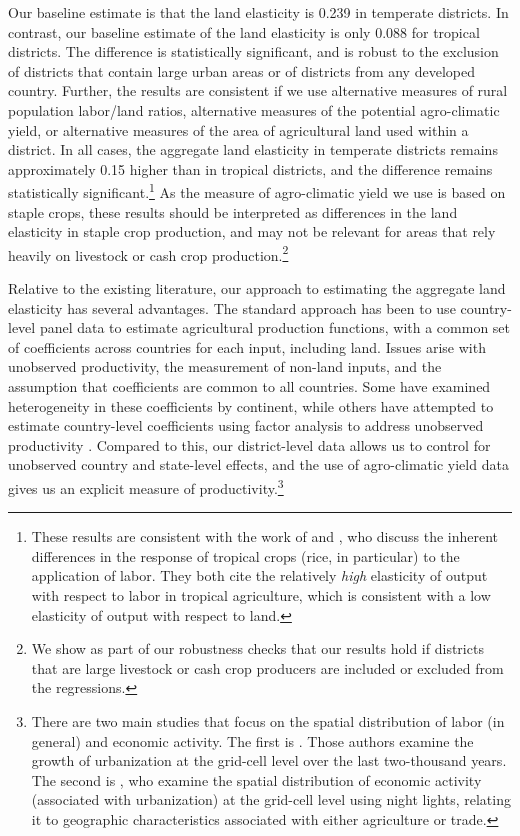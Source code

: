 \documentclass[11pt]{article}
\begin{document}
Our baseline estimate is that the land elasticity is 0.239 in temperate districts. In contrast, our baseline estimate of the land elasticity is only 0.088 for tropical districts. The difference is statistically significant, and is robust to the exclusion of districts that contain large urban areas or of districts from any developed country. Further, the results are consistent if we use alternative measures of rural population labor/land ratios, alternative measures of the potential agro-climatic yield, or alternative measures of the area of agricultural land used within a district. In all cases, the aggregate land elasticity in temperate districts remains approximately 0.15 higher than in tropical districts, and the difference remains statistically significant.\footnote{These results are consistent with the work of \citet{Ruthenberg:1976zr} and \citet{bray1994}, who discuss the inherent differences in the response of tropical crops (rice, in particular) to the application of labor. They both cite the relatively \textit{high} elasticity of output with respect to labor in tropical agriculture, which is consistent with a low elasticity of output with respect to land.} As the measure of agro-climatic yield we use is based on staple crops, these results should be interpreted as differences in the land elasticity in staple crop production, and may not be relevant for areas that rely heavily on livestock or cash crop production.\footnote{We show as part of our robustness checks that our results hold if districts that are large livestock or cash crop producers are included or excluded from the regressions.}

Relative to the existing literature, our approach to estimating the aggregate land elasticity has several advantages. The standard approach has been to use country-level panel data \citep{Hayami:1970ly,Hayami:1985cr,cpr1997,mm2001,Mundlak:2000dq,mbl2012,et2013mango} to estimate agricultural production functions, with a common set of coefficients across countries for each input, including land. Issues arise with unobserved productivity, the measurement of non-land inputs, and the assumption that coefficients are common to all countries. Some have examined heterogeneity in these coefficients \citep{gg2003,Wiebe2003Resource-Qualit} by continent, while others have attempted to estimate country-level coefficients using factor analysis to address unobserved productivity \citep{et2013mango,ev2016clim}. Compared to this, our district-level data allows us to control for unobserved country and state-level effects, and the use of agro-climatic yield data gives us an explicit measure of productivity.\footnote{There are two main studies that focus on the spatial distribution of labor (in general) and economic activity. The first is \citet{mfm2014}. Those authors examine the growth of urbanization at the grid-cell level over the last two-thousand years. The second is \citet{hssw2016}, who examine the spatial distribution of economic activity (associated with urbanization) at the grid-cell level using night lights, relating it to geographic characteristics associated with either agriculture or trade.} 
\end{document}
